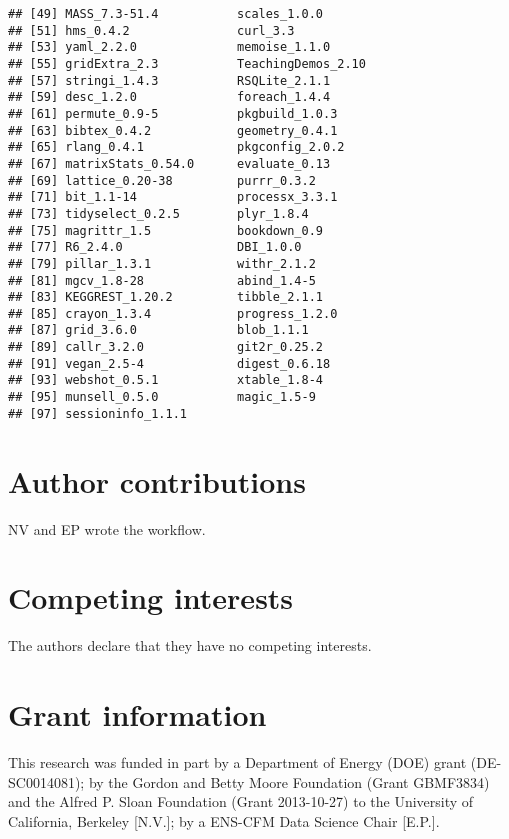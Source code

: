\documentclass[9pt,a4paper,]{extarticle}
\begin{document}
\begin{verbatim}
## [49] MASS_7.3-51.4           scales_1.0.0           
## [51] hms_0.4.2               curl_3.3               
## [53] yaml_2.2.0              memoise_1.1.0          
## [55] gridExtra_2.3           TeachingDemos_2.10     
## [57] stringi_1.4.3           RSQLite_2.1.1          
## [59] desc_1.2.0              foreach_1.4.4          
## [61] permute_0.9-5           pkgbuild_1.0.3         
## [63] bibtex_0.4.2            geometry_0.4.1         
## [65] rlang_0.4.1             pkgconfig_2.0.2        
## [67] matrixStats_0.54.0      evaluate_0.13          
## [69] lattice_0.20-38         purrr_0.3.2            
## [71] bit_1.1-14              processx_3.3.1         
## [73] tidyselect_0.2.5        plyr_1.8.4             
## [75] magrittr_1.5            bookdown_0.9           
## [77] R6_2.4.0                DBI_1.0.0              
## [79] pillar_1.3.1            withr_2.1.2            
## [81] mgcv_1.8-28             abind_1.4-5            
## [83] KEGGREST_1.20.2         tibble_2.1.1           
## [85] crayon_1.3.4            progress_1.2.0         
## [87] grid_3.6.0              blob_1.1.1             
## [89] callr_3.2.0             git2r_0.25.2           
## [91] vegan_2.5-4             digest_0.6.18          
## [93] webshot_0.5.1           xtable_1.8-4           
## [95] munsell_0.5.0           magic_1.5-9            
## [97] sessioninfo_1.1.1
\end{verbatim}

\hypertarget{author-contributions}{%
\section{Author contributions}\label{author-contributions}}

NV and EP wrote the workflow.

\hypertarget{competing-interests}{%
\section{Competing interests}\label{competing-interests}}

The authors declare that they have no competing interests.

\hypertarget{grant-information}{%
\section{Grant information}\label{grant-information}}

This research was funded in part by a Department of Energy (DOE) grant
(DE-SC0014081); by the Gordon and Betty Moore Foundation (Grant GBMF3834) and
the Alfred P. Sloan Foundation (Grant 2013-10-27) to the University of
California, Berkeley {[}N.V.{]}; by a ENS-CFM Data Science Chair {[}E.P.{]}.
\end{document}
